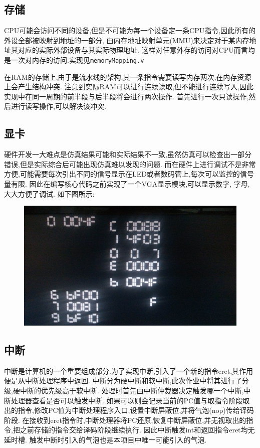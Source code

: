 \subsection{存储}
CPU可能会访问不同的设备,但是不可能为每一个设备定一条CPU指令,因此所有的外设全部被映射到地址的一部分,
由内存地址映射单元(MMU)来决定对于某内存地址其对应的实际外部设备与其实际物理地址.
这样对任意外存的访问对CPU而言均是一次对内存的访问.实现见\verb|memoryMapping.v|

在RAM的存储上,由于是流水线的架构,其一条指令需要读写内存两次,在内存资源上会产生结构冲突.
注意到实际RAM可以进行连续读取,但不能进行连续写入,因此实现中在同一周期的前半段与后半段将会进行两次操作.
首先进行一次只读操作,然后进行读写操作,可以解决该冲突.
\subsection{显卡}
硬件开发一大难点是仿真结果可能和实际结果不一致,虽然仿真可以检查出一部分错误,但是实际综合后可能出现仿真难以发现的问题.
而在硬件上进行调试不是非常方便,可能需要每次引出不同的信号显示在LED或者数码管上,每次可以监控的信号量有限.
因此在编写核心代码之前实现了一个VGA显示模块,可以显示数字, 字母, 大大方便了调试. 如下图所示:
\begin{figure}[H]
  \centering
  \includegraphics[width=\textwidth]{figure/vga.jpg}
\end{figure}

\subsection{中断}
中断是计算机的一个重要组成部分.为了实现中断,引入了一个新的指令eret,其作用便是从中断处理程序中返回.
中断分为硬中断和软中断,此次作业中将其进行了分级,硬中断的优先级高于软中断.
处理时首先由中断仲裁器决定触发哪一个中断,中断处理器查看是否可以触发中断.
如果可以则会记录当前的PC值与取指令阶段取出的指令,修改PC值为中断处理程序入口,设置中断屏蔽位,并将气泡(nop)传给译码阶段.
在接收到eret指令时,中断处理器将PC还原,恢复中断屏蔽位,并无视取出的指令,把之前存储的指令交给译码阶段继续执行.
因此中断触发int和返回指令eret均无延时槽.
触发中断时引入的气泡也是本项目中唯一可能引入的气泡.

